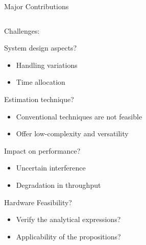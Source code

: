 \documentclass[16pt]{beamer}
\newcommand{\fs}[2]{\fontsize{#1 pt}{#2}\selectfont}
\begin{document}
\begin{frame}[t]{Major Contributions}
\begin{columns}
		\begin{column}[t]{0.48\columnwidth}
			\centering Challenges: \\[-0.2em]
				\fs{8}{8}
				\begin{block}{\footnotesize System design aspects?} %
					\begin{itemize} 
						\item Handling variations 
						\item Time allocation 
					\end{itemize}
				\end{block}
				\vspace{3.4mm}
				{
				\begin{block}{\footnotesize Estimation technique?} %
					\begin{itemize}
						\item Conventional techniques are not feasible  
						\item Offer low-complexity and versatility %
					\end{itemize}
				\end{block}
				}
				\vspace{-1.1mm}
				{
				\begin{block}{\footnotesize Impact on performance?}%
					\begin{itemize}
						\item Uncertain interference 
						\item Degradation in throughput 
					\end{itemize} 
				\end{block}
				}	
				\vspace{-0.9mm}
				{
				\begin{block}{\footnotesize Hardware Feasibility?}%
					\begin{itemize}
					\item Verify the analytical expressions? 
					\item Applicability of the propositions? 
					\end{itemize}	
				\end{block}
				}
		\end{column}
		

\end{columns}
\end{frame}
\end{document}
